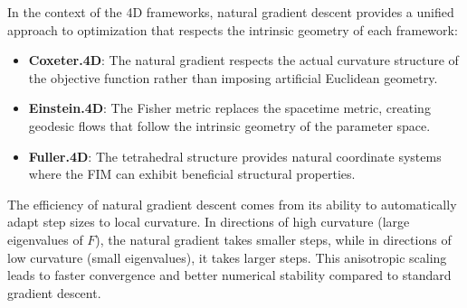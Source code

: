 \documentclass[
  10pt,
]{article}
\providecommand{\tightlist}{%
  \setlength{\itemsep}{0pt}\setlength{\parskip}{0pt}}
\begin{document}
In the context of the 4D frameworks, natural gradient descent provides a
unified approach to optimization that respects the intrinsic geometry of
each framework:

\begin{itemize}
\tightlist
\item
  \textbf{Coxeter.4D}: The natural gradient respects the actual
  curvature structure of the objective function rather than imposing
  artificial Euclidean geometry.
\item
  \textbf{Einstein.4D}: The Fisher metric replaces the spacetime metric,
  creating geodesic flows that follow the intrinsic geometry of the
  parameter space.
\item
  \textbf{Fuller.4D}: The tetrahedral structure provides natural
  coordinate systems where the FIM can exhibit beneficial structural
  properties.
\end{itemize}

The efficiency of natural gradient descent comes from its ability to
automatically adapt step sizes to local curvature. In directions of high
curvature (large eigenvalues of \(F\)), the natural gradient takes
smaller steps, while in directions of low curvature (small eigenvalues),
it takes larger steps. This anisotropic scaling leads to faster
convergence and better numerical stability compared to standard gradient
descent.
\end{document}
